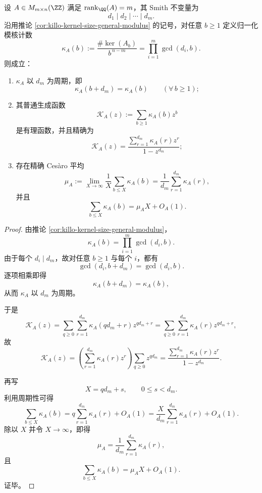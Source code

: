 \begin{conclusion}\label{con:xi-time-part62d-smith-kappa-periodic-ogf-cesaro}
设 \(A\in M_{m\times n}(\ZZ)\) 满足 \(\operatorname{rank}_{\QQ}(A)=m\)，其 Smith 不变量为
\[
d_1\mid d_2\mid\cdots\mid d_m.
\]
沿用推论 \ref{cor:killo-kernel-size-general-modulus} 的记号，对任意 \(b\ge 1\) 定义归一化模核计数
\[
\kappa_A(b)
:=
\frac{\#\ker(A_b)}{b^{\,n-m}}
=
\prod_{i=1}^{m}\gcd(d_i,b).
\]
则成立：
\begin{enumerate}
  \item \(\kappa_A\) 以 \(d_m\) 为周期，即
  \[
  \kappa_A(b+d_m)=\kappa_A(b)\qquad(\forall\,b\ge 1);
  \]
  \item 其普通生成函数
  \[
  \mathscr K_A(z):=\sum_{b\ge 1}\kappa_A(b)z^b
  \]
  是有理函数，并且精确为
  \[
  \mathscr K_A(z)
  =
  \frac{\sum_{r=1}^{d_m}\kappa_A(r)z^r}{1-z^{d_m}};
  \]
  \item 存在精确 Ces\`aro 平均
  \[
  \mu_A
  :=
  \lim_{X\to\infty}\frac{1}{X}\sum_{b\le X}\kappa_A(b)
  =
  \frac{1}{d_m}\sum_{r=1}^{d_m}\kappa_A(r),
  \]
  并且
  \[
  \sum_{b\le X}\kappa_A(b)=\mu_A X+O_A(1).
  \]
\end{enumerate}
\end{conclusion}
\begin{proof}
由推论 \ref{cor:killo-kernel-size-general-modulus}，
\[
\kappa_A(b)=\prod_{i=1}^{m}\gcd(d_i,b).
\]
由于每个 \(d_i\mid d_m\)，故对任意 \(b\ge 1\) 与每个 \(i\)，都有
\[
\gcd(d_i,b+d_m)=\gcd(d_i,b).
\]
逐项相乘即得
\[
\kappa_A(b+d_m)=\kappa_A(b),
\]
从而 \(\kappa_A\) 以 \(d_m\) 为周期。

于是
\[
\mathscr K_A(z)
=
\sum_{q\ge 0}\sum_{r=1}^{d_m}\kappa_A(qd_m+r)z^{qd_m+r}
=
\sum_{q\ge 0}\sum_{r=1}^{d_m}\kappa_A(r)z^{qd_m+r},
\]
故
\[
\mathscr K_A(z)
=
\left(\sum_{r=1}^{d_m}\kappa_A(r)z^r\right)\sum_{q\ge 0}z^{qd_m}
=
\frac{\sum_{r=1}^{d_m}\kappa_A(r)z^r}{1-z^{d_m}}.
\]

再写
\[
X=qd_m+s,\qquad 0\le s<d_m.
\]
利用周期性可得
\[
\sum_{b\le X}\kappa_A(b)
=
q\sum_{r=1}^{d_m}\kappa_A(r)+O_A(1)
=
\frac{X}{d_m}\sum_{r=1}^{d_m}\kappa_A(r)+O_A(1).
\]
除以 \(X\) 并令 \(X\to\infty\)，即得
\[
\mu_A=\frac{1}{d_m}\sum_{r=1}^{d_m}\kappa_A(r),
\]
且
\[
\sum_{b\le X}\kappa_A(b)=\mu_A X+O_A(1).
\]
证毕。
\end{proof}

